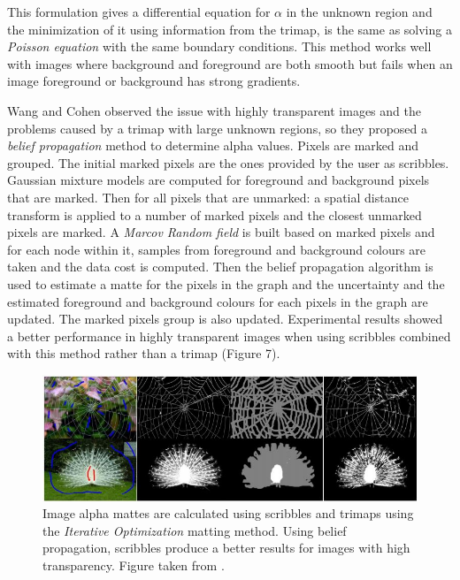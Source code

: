 This formulation gives a differential equation for $\alpha$ in the unknown region and the minimization of it using information from the trimap, is the same as solving a \textit{Poisson equation} with the same boundary conditions. This method works well with images where background and foreground are both smooth but fails when an image foreground or background has strong gradients.
\par
Wang and Cohen \cite{iterativeoptimization} observed the issue with highly transparent images and the problems caused by a trimap with large unknown regions, so they proposed a \textit{belief propagation} method to determine alpha values. Pixels are marked and grouped. The initial marked pixels are the ones provided by the user as scribbles. Gaussian mixture models are computed for foreground and background pixels that are marked. Then for all pixels that are unmarked: a spatial distance transform is applied to a number of marked pixels and the closest unmarked pixels are marked. A \textit{Marcov Random field} is built based on marked pixels and for each node within it, samples from foreground and background colours are taken and the data cost is computed. Then the belief propagation algorithm is used to estimate a matte for the pixels in the graph and the uncertainty and the estimated foreground and background colours for each pixels in the graph are updated. The marked pixels group is also updated. Experimental results showed a better performance in highly transparent images when using scribbles combined with this method rather than a trimap (Figure 7).

\begin{figure}[t!]
\centering
\includegraphics[width=1\columnwidth]{Chapter2/2/2_4_figure_1.jpg}
\caption[Iterative optimization matting results.]{Image alpha mattes are calculated using scribbles and trimaps using the \textit{Iterative Optimization} matting method. Using belief propagation, scribbles produce a better results for images with high transparency. Figure taken from \cite{iterativeoptimization}.}
\label{fig:iterative-optimization-f}
\end{figure}

